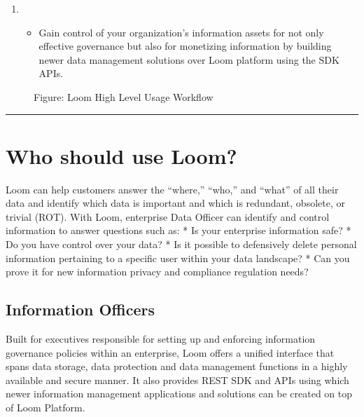\documentclass[letterpaper,10pt,english]{sphinxmanual}
\begin{document}
\begin{enumerate}
\begin{itemize}
\end{itemize}

\item {} 
\begin{itemize}
\item {} 
Gain control of your organization’s information assets for not only effective governance but also for monetizing information by building newer data management solutions over Loom platform using the SDK APIs.

\end{itemize}

\end{enumerate}

\begin{figure}[htbp]
\centering
\capstart

\noindent{}
\caption{Figure: Loom High Level Usage Workflow}\label{\detokenize{loom_getting_started_guide:id12}}\end{figure}


\bigskip\hrule\bigskip



\chapter{Who should use Loom?}
\label{\detokenize{loom_getting_started_guide:who-should-use-loom}}
Loom can help customers answer the “where,” “who,” and “what” of all their data and identify which data is important and which is redundant, obsolete, or trivial (ROT). With Loom, enterprise Data Officer can identify and control information to answer questions such as:
* Is your enterprise information safe?
* Do you have control over your data?
* Is it possible to defensively delete personal information pertaining to a specific user within your data landscape?
* Can you prove it for new information privacy and compliance regulation needs?


\section{Information Officers}
\label{\detokenize{loom_getting_started_guide:information-officers}}
Built for executives responsible for setting up and enforcing information governance policies within an enterprise, Loom offers a unified interface that spans data storage, data protection and data management functions in a highly available and secure manner.  It also provides REST SDK and APIs using which newer information management applications and solutions can be created on top of Loom Platform.
\end{document}

